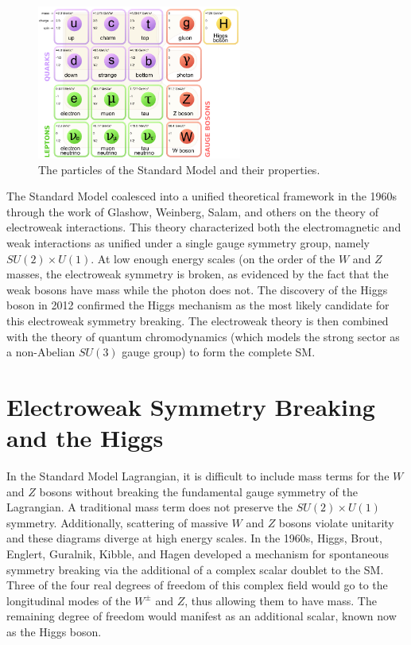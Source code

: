 \begin{figure}[h!]
  \centering
  \captionsetup{justification=centering}

  \includegraphics[width=0.6\textwidth]{figures/SM_particles}
  \caption{The particles of the Standard Model and their properties\cite{PDG}.}
  \label{fig:sm_particles}
\end{figure}

The Standard Model coalesced into a unified theoretical framework in the 1960s through the work of Glashow, Weinberg, Salam, and others on the theory of electroweak interactions\cite{Glashow, Weinberg, Salam, Glashow2}. This theory characterized both the electromagnetic and weak interactions as unified under a single gauge symmetry group, namely $SU(2) \times U(1)$. At low enough energy scales (on the order of the $W$ and $Z$ masses, the electroweak symmetry is broken, as evidenced by the fact that the weak bosons have mass while the photon does not. The discovery of the Higgs boson in 2012 confirmed the Higgs mechanism as the most likely candidate for this electroweak symmetry breaking\cite{Discovery, CMSDiscovery}. The electroweak theory is then combined with the theory of quantum chromodynamics (which models the strong sector as a non-Abelian $SU(3)$ gauge group) to form the complete SM\cite{QCDBook}. 

\section{Electroweak Symmetry Breaking and the Higgs}

In the Standard Model Lagrangian, it is difficult to include mass terms for the $W$ and $Z$ bosons without breaking the fundamental gauge symmetry of the Lagrangian. A traditional mass term does not preserve the $SU(2) \times U(1)$ symmetry. Additionally, scattering of massive $W$ and $Z$ bosons violate unitarity and these diagrams diverge at high energy scales. In the 1960s, Higgs, Brout, Englert, Guralnik, Kibble, and Hagen developed a mechanism for spontaneous symmetry breaking via the additional of a complex scalar doublet to the SM. Three of the four real degrees of freedom of this complex field would go to the longitudinal modes of the $W^{\pm}$ and $Z$, thus allowing them to have mass\cite{Higgs1,Higgs2,Englert,Guralnik}. The remaining degree of freedom would manifest as an additional scalar, known now as the Higgs boson. 

